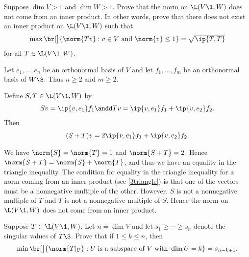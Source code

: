 \exercise
Suppose $\dim V > 1$ and $\dim W > 1$. Prove that the norm on $\L(V\1, W)$ does not come from an inner product. In other words, prove that there does not exist an inner product on $\L(V\1, W)$ such that \label{6notinner}
\[
\max \br[\big]{ \norm{Tv} : v \in V \text{ and } \norm{v} \le 1} = {\textstyle \sqrt{\ip{T, T}}}
\]
for all $T \in \L(V\1, W)$.

\begin{Solution}
Let $e_1, \ldots, e_n$ be an orthonormal basis of $V$ and let $f_1, \ldots, f_m$ be an orthonormal basis of $W\3$. Thus $n \ge 2$ and $m \ge 2$.

Define $S, T \in \L(V\1, W)$ by
\[
Sv = \ip{v, e_1} f_1 \andd Tv = \ip{v,e_1} f_1 + \ip{v, e_2} f_2.
\]
Then
\[
(S+T)v = 2\ip{v,e_1} f_1 + \ip{v, e_2} f_2.
\]

We have $\norm{S} = \norm{T} = 1$ and $\norm{S+T} = 2$. Hence $\norm{S+T} = \norm{S} + \norm{T}$, and thus we have an equality in the triangle inequality. The condition for equality in the triangle inequality for a norm coming from an inner product (see \ref{3triangle}) is that one of the vectors must be a nonnegative multiple of the other. However, $S$ is not a nonnegative multiple of $T$ and $T$ is not a nonnegative multiple of $S$. Hence the norm on $\L(V\1,W)$ does not come from an inner product.
\end{Solution}

\exercise
Suppose $T \in \L(V\1, W)$. Let $n = \dim V$ and let $s_1 \ge \cdots \ge s_n$ denote the singular values of $T\3$. Prove that if $1 \le k \le n$, then \label{7approx}
\[
\min \br[\big]{ \norm{T|_U} : U \text { is a subspace of } V \text{ with } \dim U = k} = s_{n-k+1}.
\]
\exercisedisplayend

